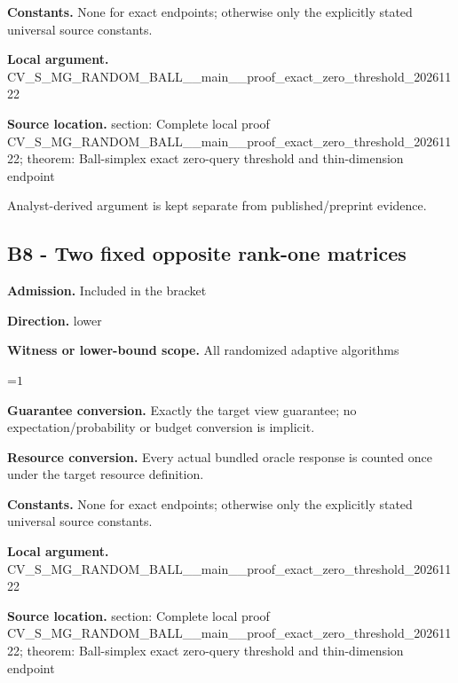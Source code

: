 \documentclass[10pt,a4paper]{article}
\newcommand{\AtlasMath}[1]{\par\begingroup\centering\setbox0=\hbox{$\displaystyle #1$}\ifdim\wd0>1.4\linewidth\typeout{ATLAS WIDE FORMULA: \the\wd0}\fi\ifdim\wd0>\linewidth\resizebox{\linewidth}{!}{\box0}\else\box0\fi\par\endgroup}
\begin{document}
\textbf{Constants.} None for exact endpoints; otherwise only the explicitly stated universal source constants.



\textbf{Local argument.} CV\_S\_MG\_RANDOM\_BALL\_\_mai\allowbreak{}n\_\_proof\_exact\_zero\_thre\allowbreak{}shold\_20261122



\textbf{Source location.}  section: Complete local proof CV\_S\_MG\_RANDOM\_BALL\_\_mai\allowbreak{}n\_\_proof\_exact\_zero\_thre\allowbreak{}shold\_20261122; theorem: Ball-simplex exact zero-query threshold and thin-dimension endpoint



Analyst-derived argument is kept separate from published/preprint evidence.



\subsection{B8 - Two fixed opposite rank-one matrices}


\textbf{Admission.} Included in the bracket



\textbf{Direction.} lower



\textbf{Witness or lower-bound scope.} All randomized adaptive algorithms



\AtlasMath{1}


\textbf{Guarantee conversion.} Exactly the target view guarantee; no expectation/probability or budget conversion is implicit.



\textbf{Resource conversion.} Every actual bundled oracle response is counted once under the target resource definition.



\textbf{Constants.} None for exact endpoints; otherwise only the explicitly stated universal source constants.



\textbf{Local argument.} CV\_S\_MG\_RANDOM\_BALL\_\_mai\allowbreak{}n\_\_proof\_exact\_zero\_thre\allowbreak{}shold\_20261122



\textbf{Source location.}  section: Complete local proof CV\_S\_MG\_RANDOM\_BALL\_\_mai\allowbreak{}n\_\_proof\_exact\_zero\_thre\allowbreak{}shold\_20261122; theorem: Ball-simplex exact zero-query threshold and thin-dimension endpoint
\end{document}
